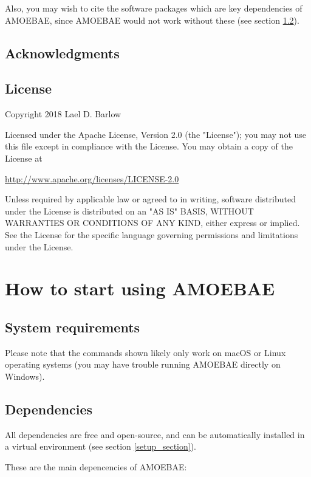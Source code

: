 \documentclass[12pt,letterpaper]{article}
\begin{document}
\begin{linenumbers}
Also, you may wish to cite the software packages which are key dependencies of
AMOEBAE, since AMOEBAE would not work without these (see section
\ref{dependencies_section}).

\subsection{Acknowledgments}

\subsection{License}
\label{license_section}

Copyright 2018 Lael D. Barlow

Licensed under the Apache License, Version 2.0 (the "License"); you may not use this file except in compliance with the License. You may obtain a copy of the License at

\url{http://www.apache.org/licenses/LICENSE-2.0}

Unless required by applicable law or agreed to in writing, software distributed under the License is distributed on an "AS IS" BASIS, WITHOUT WARRANTIES OR CONDITIONS OF ANY KIND, either express or implied. See the License for the specific language governing permissions and limitations under the License.


\section{How to start using AMOEBAE}

\subsection{System requirements}

Please note that the commands shown likely only work on macOS or Linux operating
systems (you may have trouble running AMOEBAE directly on Windows). 


\subsection{Dependencies}
\label{dependencies_section}

All dependencies are free and open-source, and can be automatically installed
in a virtual environment (see section \ref{setup_section}).

These are the main depencencies of AMOEBAE:


\end{linenumbers}
\end{document}
